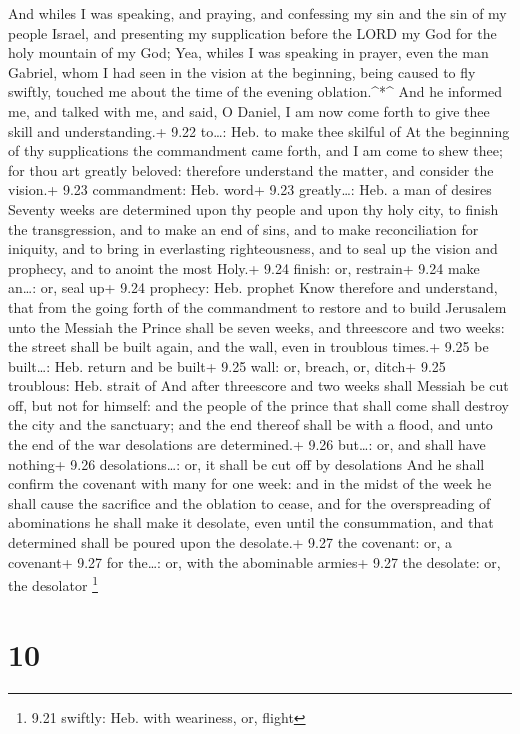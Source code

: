  And whiles I was speaking, and praying, and confessing my
sin and the sin of my people Israel, and presenting my supplication
before the LORD my God for the holy mountain of my God; 
Yea, whiles I was speaking in prayer, even the man Gabriel, whom I had
seen in the vision at the beginning, being caused to fly swiftly,
touched me about the time of the evening oblation.\^{}*\^{}
 And he informed me, and talked with me, and said, O
Daniel, I am now come forth to give thee skill and understanding.+ 9.22
to\ldots: Heb. to make thee skilful of  At the beginning of
thy supplications the commandment came forth, and I am come to shew
thee; for thou art greatly beloved: therefore understand the matter, and
consider the vision.+ 9.23 commandment: Heb. word+ 9.23 greatly\ldots:
Heb. a man of desires  Seventy weeks are determined upon
thy people and upon thy holy city, to finish the transgression, and to
make an end of sins, and to make reconciliation for iniquity, and to
bring in everlasting righteousness, and to seal up the vision and
prophecy, and to anoint the most Holy.+ 9.24 finish: or, restrain+ 9.24
make an\ldots: or, seal up+ 9.24 prophecy: Heb. prophet 
Know therefore and understand, that from the going forth of the
commandment to restore and to build Jerusalem unto the Messiah the
Prince shall be seven weeks, and threescore and two weeks: the street
shall be built again, and the wall, even in troublous times.+ 9.25 be
built\ldots: Heb. return and be built+ 9.25 wall: or, breach, or, ditch+
9.25 troublous: Heb. strait of  And after threescore and
two weeks shall Messiah be cut off, but not for himself: and the people
of the prince that shall come shall destroy the city and the sanctuary;
and the end thereof shall be with a flood, and unto the end of the war
desolations are determined.+ 9.26 but\ldots: or, and shall have nothing+
9.26 desolations\ldots: or, it shall be cut off by desolations
 And he shall confirm the covenant with many for one week:
and in the midst of the week he shall cause the sacrifice and the
oblation to cease, and for the overspreading of abominations he shall
make it desolate, even until the consummation, and that determined shall
be poured upon the desolate.+ 9.27 the covenant: or, a covenant+ 9.27
for the\ldots: or, with the abominable armies+ 9.27 the desolate: or,
the desolator \footnote{9.21 swiftly: Heb. with weariness, or, flight}

\hypertarget{section-9}{%
\section{10}\label{section-9}}

